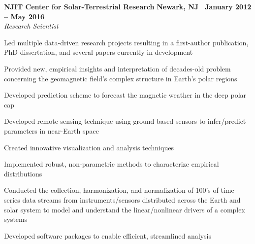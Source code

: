 \documentclass[10pt]{article}
\newcommand{\leftandright}[2]{\noindent\textbf{#1}\hfill
\textbf{#2}}
\begin{document}
\leftandright{NJIT Center for Solar-Terrestrial Research}{Newark, NJ \textbullet\, January
2012 -- May 2016} \\  
\vspace{-0.8em}
\textit{Research Scientist} 
\begin{itemize*}
  \item Led multiple data-driven research projects resulting in a
    first-author publication, PhD dissertation, and several papers 
    currently in development
  \item Provided new, empirical insights and interpretation of
    decades-old problem concerning the geomagnetic field's complex
    structure in Earth's polar regions
  \item Developed prediction scheme to forecast the magnetic weather
    in the deep polar cap
  \item Developed remote-sensing technique using ground-based sensors
    to infer/predict parameters in near-Earth space
  \item Created innovative visualization and analysis techniques
  \item Implemented robust, non-parametric 
    methods to characterize empirical distributions
  \item Conducted the collection, harmonization, and normalization of
    100's of time series data streams from instruments/sensors
    distributed across the Earth and solar system to model and
    understand the linear/nonlinear drivers of a complex systems
  \item Developed software packages to enable efficient, streamlined analysis 
\end{itemize*}
\end{document}
